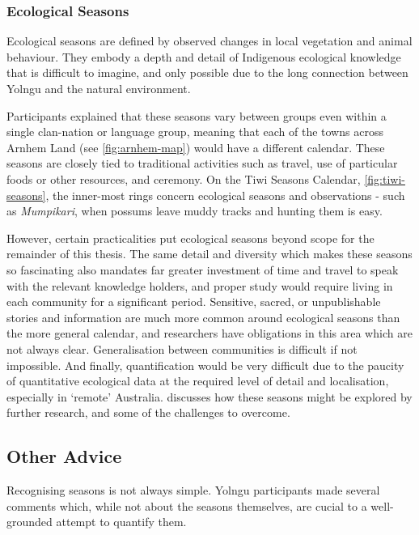 \subsubsection{Ecological Seasons}
Ecological seasons are defined by observed changes in local vegetation
and animal behaviour.  They embody a depth and detail of Indigenous
ecological knowledge that is difficult to imagine, and only possible
due to the long connection between Yolngu and the natural environment.

Participants explained that these seasons vary between groups even within
a single clan-nation or language group, meaning that each of the towns
across Arnhem Land (see \cref{fig:arnhem-map}) would have a different
calendar. These seasons are closely tied to traditional activities such as
travel, use of particular foods or other resources, and ceremony.
%
On the Tiwi Seasons Calendar, \cref{fig:tiwi-seasons}, the inner-most
rings concern ecological seasons and observations - such as
\textit{Mumpikari}, when possums leave muddy tracks and hunting them is easy.

However, certain practicalities put ecological seasons beyond scope
for the remainder of this thesis.
The same detail and diversity which makes these seasons so fascinating
also mandates far greater investment of time and travel to speak
with the relevant knowledge holders, and proper study would require
living in each community for a significant period.
Sensitive, sacred, or unpublishable stories and information are much more
common around ecological seasons than the more general calendar,
and researchers have obligations in this area which are not always clear.
Generalisation between communities is difficult if not impossible.
And finally, quantification would be very difficult due to the paucity
of quantitative ecological data at the required level of detail
and localisation, especially in `remote' Australia.
%
 discusses how these seasons might be explored
by further research, and some of the challenges to overcome.



\subsection{Other Advice}
\label{subsec:detection-advice}

Recognising seasons is not always simple.  Yolngu participants made
several comments which, while not about the seasons themselves, are
cucial to a well-grounded attempt to quantify them.

